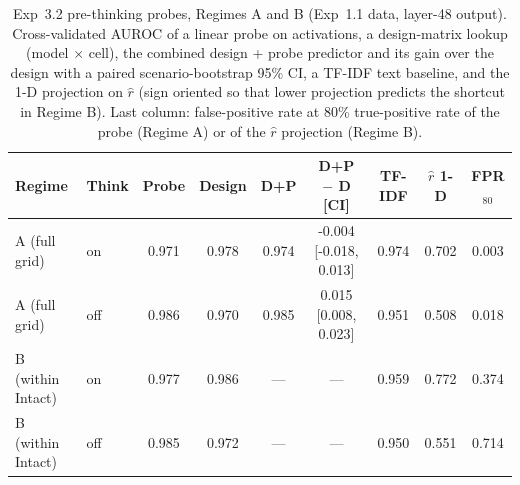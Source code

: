 \begin{table}[t]
\centering
\scriptsize
\setlength{\tabcolsep}{4pt}
\caption{Exp~3.2 pre-thinking probes, Regimes A and B (Exp~1.1 data, layer-48 output). Cross-validated AUROC of a linear probe on activations, a design-matrix lookup (model $\times$ cell), the combined design + probe predictor and its gain over the design with a paired scenario-bootstrap 95\% CI, a TF-IDF text baseline, and the 1-D projection on $\hat r$ (sign oriented so that lower projection predicts the shortcut in Regime B). Last column: false-positive rate at 80\% true-positive rate of the probe (Regime A) or of the $\hat r$ projection (Regime B).}
\label{tab:exp32ab}
\begin{tabular}{llccccccc}
\toprule
Regime & Think & Probe & Design & D+P & D+P $-$ D [CI] & TF-IDF & $\hat r$ 1-D & FPR$_{80}$ \\
\midrule
A (full grid) & on & 0.971 & 0.978 & 0.974 & -0.004 [-0.018, 0.013] & 0.974 & 0.702 & 0.003 \\
A (full grid) & off & 0.986 & 0.970 & 0.985 & 0.015 [0.008, 0.023] & 0.951 & 0.508 & 0.018 \\
B (within Intact) & on & 0.977 & 0.986 & --- & --- & 0.959 & 0.772 & 0.374 \\
B (within Intact) & off & 0.985 & 0.972 & --- & --- & 0.950 & 0.551 & 0.714 \\
\bottomrule
\end{tabular}
\end{table}
